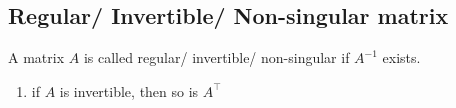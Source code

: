 \subsection{Regular/ Invertible/ Non-singular matrix}

A matrix $A$ is called regular/ invertible/ non-singular if $A^{-1}$ exists.
\hfill \cite{mfml/book/mml/Deisenroth-Faisal-Ong}

\begin{enumerate}
    \item if $A$ is invertible, then so is $A^\top$
    \hfill \cite{mfml/book/mml/Deisenroth-Faisal-Ong}
\end{enumerate}


